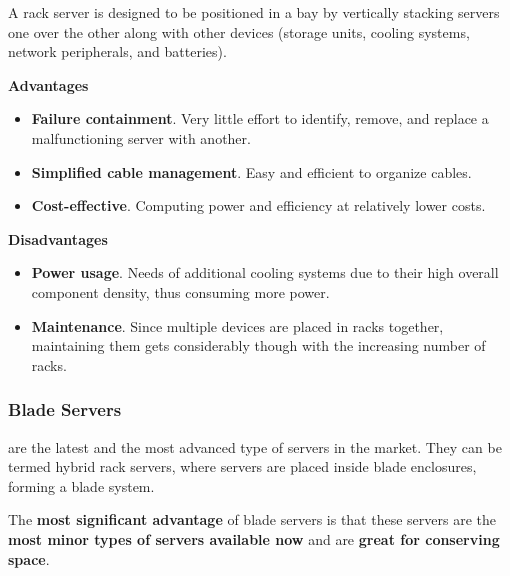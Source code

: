 \highspace
A rack server is designed to be positioned in a bay by vertically stacking servers one over the other along with other devices (storage units, cooling systems, network peripherals, and batteries).

\begin{flushleft}
    \textcolor{Green3}{ \textbf{Advantages}}
\end{flushleft}
\begin{itemize}[label=]
    \item \textbf{Failure containment}. Very little effort to identify, remove, and replace a malfunctioning server with another.

    \item \textbf{Simplified cable management}. Easy and efficient to organize cables.

    \item \textbf{Cost-effective}. Computing power and efficiency at relatively lower costs.
\end{itemize}

\newpage

\begin{flushleft}
    \textcolor{Red2}{ \textbf{Disadvantages}}
\end{flushleft}
\begin{itemize}[label=]
    \item \textbf{Power usage}. Needs of additional cooling systems due to their high overall component density, thus consuming more power.

    \item \textbf{Maintenance}. Since multiple devices are placed in racks together, maintaining them gets considerably though with the increasing number of racks.
\end{itemize}

\newpage

\subsubsection*{Blade Servers}

 are the latest and the most advanced type of servers in the market. They can be termed hybrid rack servers, where servers are placed inside blade enclosures, forming a blade system.

\highspace
The \textbf{most significant advantage} of blade servers is that these servers are the \textbf{most minor types of servers available now} and are \textbf{great for conserving space}.

